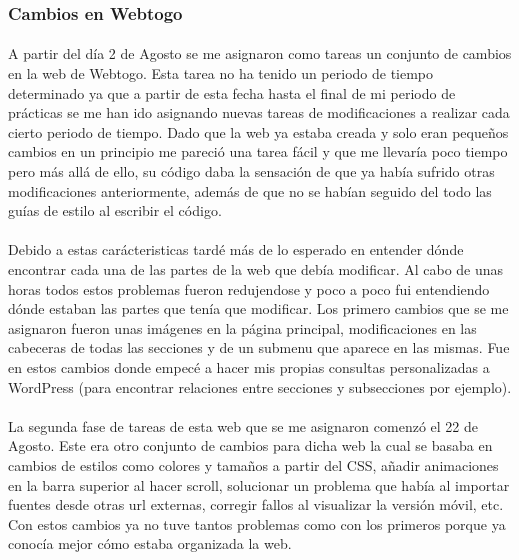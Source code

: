 \documentclass[10pt, a4paper,spanish]{article}
\begin{document}
            \subsubsection{Cambios en Webtogo}

                \paragraph{}
                A partir del día 2 de Agosto se me asignaron como tareas un conjunto de cambios en la web de Webtogo. Esta tarea no ha tenido un periodo de tiempo determinado ya que a partir de esta fecha hasta el final de mi periodo de prácticas se me han ido asignando nuevas tareas de modificaciones a realizar cada cierto periodo de tiempo. Dado que la web ya estaba creada y solo eran pequeños cambios en un principio me pareció una tarea fácil y que me llevaría poco tiempo pero más allá de ello, su código daba la sensación de que ya había sufrido otras modificaciones anteriormente, además de que no se habían seguido del todo las guías de estilo al escribir el código.

                \paragraph{}
                Debido a estas carácteristicas tardé más de lo esperado en entender dónde encontrar cada una de las partes de la web que debía modificar. Al cabo de unas horas todos estos problemas fueron redujendose y poco a poco fui entendiendo dónde estaban las partes que tenía que modificar. Los primero cambios que se me asignaron fueron unas imágenes en la página principal, modificaciones en las cabeceras de todas las secciones y de un submenu que aparece en las mismas. Fue en estos cambios donde empecé a hacer mis propias consultas personalizadas a WordPress (para encontrar relaciones entre secciones y subsecciones por ejemplo).

                \paragraph{}
                La segunda fase de tareas de esta web que se me asignaron comenzó el 22 de Agosto. Este era otro conjunto de cambios para dicha web la cual se basaba en cambios de estilos como colores y tamaños a partir del CSS, añadir animaciones en la barra superior al hacer scroll, solucionar un problema que había al importar fuentes desde otras url externas, corregir fallos al visualizar la versión móvil, etc. Con estos cambios ya no tuve tantos problemas como con los primeros porque ya conocía mejor cómo estaba organizada la web.
\end{document}
